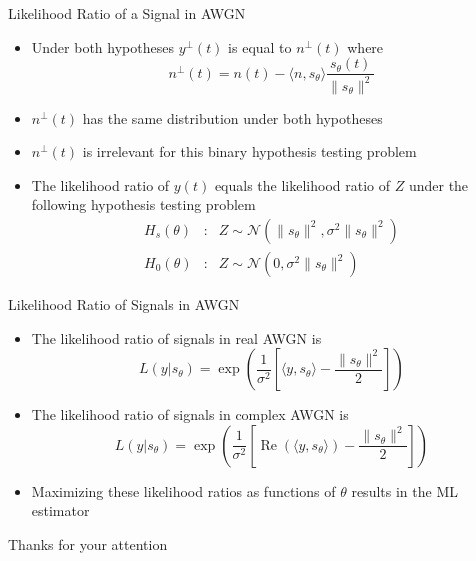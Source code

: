 \documentclass[t]{beamer}
\renewcommand\Re{\operatorname{Re}}
\begin{document}
\begin{frame}{Likelihood Ratio of a Signal in AWGN}
  \footnotesize
  \begin{itemize}
    \item Under both hypotheses $y^\perp(t)$ is equal to $n^\perp(t)$ where
      \begin{equation*}
        n^\perp(t) = n(t) -\langle n, s_\theta\rangle \frac{s_\theta(t)}{\lVert s_\theta\rVert^2}
      \end{equation*}
    \item \pause $n^\perp(t)$ has the same distribution under both hypotheses
    \item \pause $n^\perp(t)$ is irrelevant for this binary hypothesis testing problem
    \item \pause The likelihood ratio of $y(t)$ equals the likelihood ratio of $Z$ under the following hypothesis testing problem
      \begin{equation*}
        \begin{array}{lcl}
          H_s(\theta) & : & Z \sim \mathcal{N}(\lVert s_\theta \rVert^2, \sigma^2\lVert s_\theta \rVert^2) \\
          H_0(\theta) & : & Z \sim \mathcal{N}(0, \sigma^2\lVert s_\theta \rVert^2) 
        \end{array}
      \end{equation*}
  \end{itemize}
  \normalsize
\end{frame}

\begin{frame}{Likelihood Ratio of Signals in AWGN}
  \footnotesize
  \begin{itemize}
    \item The likelihood ratio of signals in real AWGN is
      \begin{equation*}
        L(y|s_\theta) = \exp\left( \frac{1}{\sigma^2} \left[\langle y, s_\theta\rangle - \frac{\lVert s_\theta \rVert^2}{2} \right]\right)
      \end{equation*}
    \item \pause The likelihood ratio of signals in complex AWGN is
      \begin{equation*}
        L(y|s_\theta) = \exp\left( \frac{1}{\sigma^2} \left[\Re(\langle y, s_\theta\rangle) - \frac{\lVert s_\theta \rVert^2}{2} \right]\right)
      \end{equation*}
    \item \pause Maximizing these likelihood ratios as functions of $\theta$ results in the ML estimator
  \end{itemize}
  \normalsize
\end{frame}

\begin{frame}{}
\vfill
\begin{center}
Thanks for your attention
\end{center}
\vfill
\end{frame}
\end{document}
